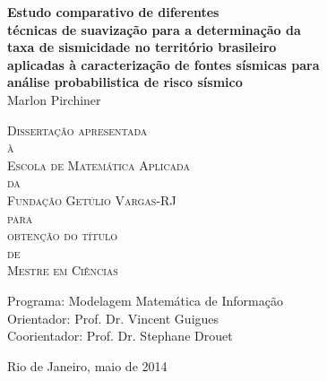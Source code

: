 \documentclass[12pt,twoside,a4paper]{book}
\begin{document}
\frontmatter 
\fancyhead[RO]{{\footnotesize\rightmark}\hspace{2em}\thepage}
\setcounter{tocdepth}{2}
\fancyhead[LE]{\thepage\hspace{2em}\footnotesize{\leftmark}}
\fancyhead[RE,LO]{}
\fancyhead[RO]{{\footnotesize\rightmark}\hspace{2em}\thepage}

\onehalfspacing  %

\thispagestyle{empty}
\begin{center}
    \vspace*{2.3cm}
    \textbf{\Large{Estudo comparativo de diferentes \\
			técnicas de suavização para a determinação da \\ 
		    taxa de sismicidade no território brasileiro \\
		    aplicadas à caracterização de fontes sísmicas para \\
		    análise probabilistica de risco sísmico}}\\
    
    \vspace*{1.2cm}
    \Large{Marlon Pirchiner}
    
    \vskip 2cm
    \textsc{
    Dissertação apresentada\\[-0.25cm] 
    à\\[-0.25cm]
    Escola de Matemática Aplicada\\[-0.25cm]
    da\\[-0.25cm]
    Fundação Getúlio Vargas-RJ\\[-0.25cm]
    para\\[-0.25cm]
    obtenção do título\\[-0.25cm]
    de\\[-0.25cm]
    Mestre em Ciências}
    
    \vskip 1.5cm
    Programa: Modelagem Matemática de Informação\\
    Orientador: Prof. Dr. Vincent Guigues\\
    Coorientador: Prof. Dr. Stephane Drouet

   	\vskip 1cm
    \normalsize{}
    
    \vskip 0.5cm
    \normalsize{Rio de Janeiro, maio de 2014}
\end{center}
\end{document}
